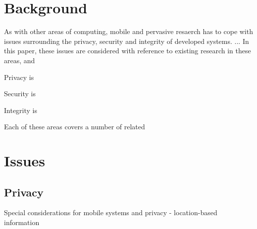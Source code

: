\documentclass[oribibl,11pt]{llncs}
\begin{document}
\section{Background}		\label{sec:background}

As with other areas of computing, mobile and pervasive resaerch has to cope with issues surrounding the privacy, security and integrity of developed systems. ... In this paper, these issues are considered with reference to existing research in these areas, and 

Privacy is

Security is

Integrity is

Each of these areas covers a number of related

\section{Issues}			\label{sec:issues}

\subsection{Privacy}		\label{sub:privacy}

Special considerations for mobile systems and privacy - location-based information


\cite{Patil:2012:RRR:2335356.2335363}
\end{document}
